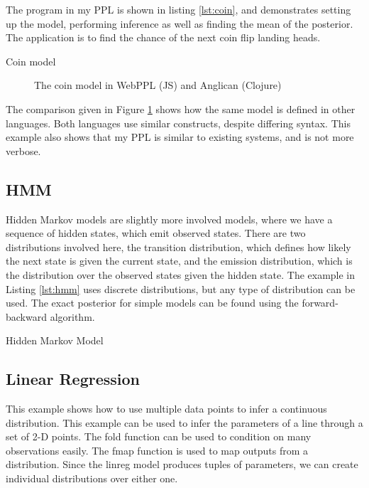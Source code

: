 The program in my PPL is shown in listing \ref{lst:coin}, and demonstrates setting up the model, performing inference as well as finding the mean of the posterior. The application is to find the chance of the next coin flip landing heads.

\begin{listing}[!ht]
	\caption{Coin model}
	\label{lst:coin}
\end{listing}


\begin{figure}[!htb]
	\begin{minipage}{0.5\textwidth}
		\centering
	\end{minipage}
	\begin{minipage}{0.5\textwidth}
		\centering
	\end{minipage}
	\caption{The coin model in WebPPL (JS) and Anglican (Clojure)}
	\label{fig:compare-coin}
\end{figure}

The comparison given in Figure \ref{fig:compare-coin} shows how the same model is defined in other languages. Both languages use similar constructs, despite differing syntax. This example also shows that my PPL is similar to existing systems, and is not more verbose.

\subsection{HMM}
Hidden Markov models are slightly more involved models, where we have a sequence of hidden states, which emit observed states. There are two distributions involved here, the transition distribution, which defines how likely the next state is given the current state, and the emission distribution, which is the distribution over the observed states given the hidden state. The example in Listing \ref{lst:hmm} uses discrete distributions, but any type of distribution can be used. The exact posterior for simple models can be found using the forward-backward algorithm.
\begin{listing}[!ht]
	\caption{Hidden Markov Model}
	\label{lst:hmm}
\end{listing}

\subsection{Linear Regression}
This example shows how to use multiple data points to infer a continuous distribution. This example can be used to infer the parameters of a line through a set of 2-D points. The fold function can be used to condition on many observations easily. The fmap function is used to map outputs from a distribution. Since the linreg model produces tuples of parameters, we can create individual distributions over either one.

